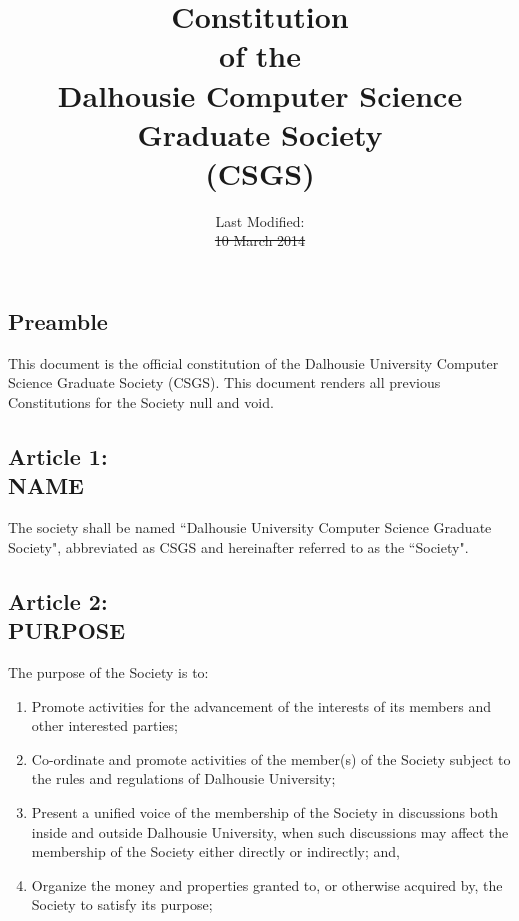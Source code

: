 \documentclass[]{report}
\title{Constitution\\of the\\Dalhousie Computer Science Graduate Society\\(CSGS)}
\author{ }
\date{Last Modified:\\\st{10 March 2014}\\\color{red}{13 March 2015}}
\begin{document}
\maketitle

\clearpage
\begin{center}
	\section*{Preamble}
	\vspace{12px}
\end{center}
\label{preamble}
	This document is the official constitution of the Dalhousie University Computer Science Graduate Society (CSGS). This document renders all previous Constitutions for the Society null and void.


\clearpage
\begin{center}
	\section*{Article 1:\\NAME}
	\vspace{12px}
\end{center}
\label{name}
	The society shall be named ``Dalhousie University Computer Science Graduate Society", abbreviated as CSGS and hereinafter referred to as the ``Society".


\clearpage
\begin{center}
	\section*{Article 2:\\PURPOSE}
	\vspace{12px}
\end{center}
\label{purpose}

	The purpose of the Society is to:\\
	
	\renewcommand{\theenumi}{\Alph{enumi}}
	\begin{enumerate}
	
		\item Promote activities for the advancement of the interests of its members and other interested parties;
		
		\item Co-ordinate and promote activities of the member(s) of the Society subject to the rules and regulations of Dalhousie University;
		
		\item Present a unified voice of the membership of the Society in discussions both inside and outside Dalhousie University, when such discussions may affect the membership of the Society either directly or indirectly; and,
		
		\item Organize the money and properties granted to, or otherwise acquired by, the Society to satisfy its purpose;

	\end{enumerate}
\end{document}
